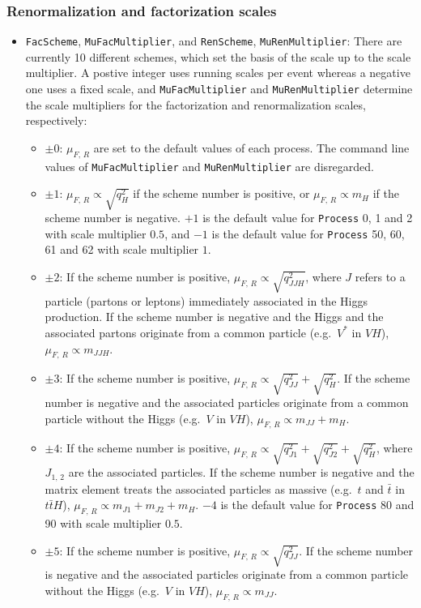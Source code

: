 \documentclass[aps,superscriptaddress,nofootinbib]{revtex4}
\newcommand{\eg}{e.g.~}
\begin{document}
\subsubsection{Renormalization and factorization scales}
\begin{itemize}
	\item \verb|FacScheme|, \verb|MuFacMultiplier|, and \verb|RenScheme|, \verb|MuRenMultiplier|: There are currently 10 different schemes, which set the basis of the scale up to the scale multiplier. A postive integer uses running scales per event whereas a negative one uses a fixed scale, and \verb|MuFacMultiplier| and \verb|MuRenMultiplier| determine the scale multipliers for the factorization and renormalization scales, respectively:
	\begin{itemize}
		\item $\pm0$: $\mu_{F,\,R}$ are set to the default values of each process. The command line values of \verb|MuFacMultiplier| and \verb|MuRenMultiplier| are disregarded.
		\item $\pm1$: $\mu_{F,\,R} \propto \sqrt{q^2_H}$ if the scheme number is positive, or $\mu_{F,\,R} \propto m_H$ if the scheme number is negative. $+1$ is the default value for \verb|Process| 0, 1 and 2 with scale multiplier $0.5$, and  $-1$ is the default value for \verb|Process| 50, 60, 61 and 62 with scale multiplier $1$.
		\item $\pm2$: If the scheme number is positive, $\mu_{F,\,R} \propto \sqrt{q^2_{JJH}}$, where $J$ refers to a particle (partons or leptons) immediately associated in the Higgs production. If the scheme number is negative and the Higgs and the associated partons originate from a common particle (\eg $V^{*}$ in $VH$), $\mu_{F,\,R} \propto m_{JJH}$.
		\item $\pm3$: If the scheme number is positive, $\mu_{F,\,R} \propto \sqrt{q^2_{JJ}}+\sqrt{q^2_{H}}$. If the scheme number is negative and the associated particles originate from a common particle without the Higgs (\eg $V$ in $VH$), $\mu_{F,\,R} \propto m_{JJ}+m_{H}$.
		\item $\pm4$: If the scheme number is positive, $\mu_{F,\,R} \propto \sqrt{q^2_{J1}}+\sqrt{q^2_{J2}}+\sqrt{q^2_{H}}$, where $J_{1,\,2}$ are the associated particles. If the scheme number is negative and the matrix element treats the associated particles as massive (\eg $t$ and $\bar{t}$ in $t\bar{t}H$), $\mu_{F,\,R} \propto m_{J1}+m_{J2}+m_{H}$.  $-4$ is the default value for \verb|Process| 80 and 90 with scale multiplier $0.5$.
		\item $\pm5$: If the scheme number is positive, $\mu_{F,\,R} \propto \sqrt{q^2_{JJ}}$. If the scheme number is negative and the associated particles originate from a common particle without the Higgs (\eg $V$ in $VH$), $\mu_{F,\,R} \propto m_{JJ}$.

\end{itemize}
\end{itemize}
\end{document}

